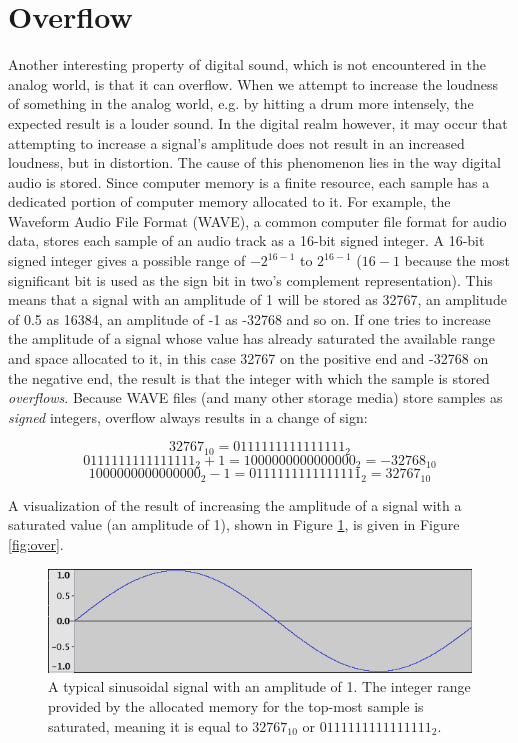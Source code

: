 \documentclass[12pt,twoside]{report}
\begin{document}
\section{Overflow}

Another interesting property of digital sound, which is not encountered in the analog world, is that it can overflow. When we attempt to increase the loudness of something in the analog world, e.g. by hitting a drum more intensely, the expected result is a louder sound. In the digital realm however, it may occur that attempting to increase a signal's amplitude does not result in an increased loudness, but in distortion. The cause of this phenomenon lies in the way digital audio is stored. Since computer memory is a finite resource, each sample has a dedicated portion of computer memory allocated to it. For example, the Waveform Audio File Format (WAVE), a common computer file format for audio data, stores each sample of an audio track as a 16-bit signed integer. A 16-bit signed integer gives a possible range of $-2^{16-1}$ to $2^{16-1}$ ($16-1$ because the most significant bit is used as the sign bit in two's complement representation). This means that a signal with an amplitude of 1 will be stored as 32767, an amplitude of 0.5 as 16384, an amplitude of -1 as -32768 and so on. If one tries to increase the amplitude of a signal whose value has already saturated the available range and space allocated to it, in this case 32767 on the positive end and -32768 on the negative end, the result is that the integer with which the sample is stored \emph{overflows}. Because WAVE files (and many other storage media) store samples as \emph{signed} integers, overflow always results in a change of sign:

$$32767_{10} = 0111111111111111_{2}$$
$$0111111111111111_{2} + 1 = 1000000000000000_{2} = -32768_{10}$$
$$1000000000000000_{2} - 1 = 0111111111111111_{2} = 32767_{10}$$

A visualization of the result of increasing the amplitude of a signal with a saturated value (an amplitude of 1), shown in Figure \ref{fig:no-over}, is given in Figure \ref{fig:over}.

\begin{figure}[h!]
  \centering
  \includegraphics[scale=0.5]{img/no-over}
  \caption{A typical sinusoidal signal with an amplitude of 1. The integer range provided by the allocated memory for the top-most sample is saturated, meaning it is equal to $32767_{10}$ or $0111111111111111_{2}$.}
  \label{fig:no-over}
\end{figure}
\end{document}
